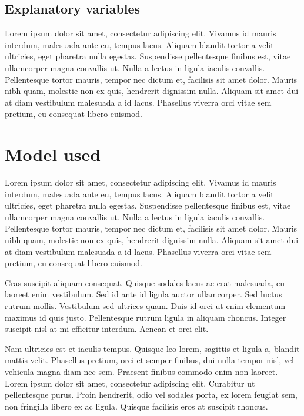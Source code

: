\documentclass[a4paper, nobind]{templates/ociamthesis}
\theoremstyle{definition}
\theoremstyle{definition}
\theoremstyle{definition}
\theoremstyle{remark}
\begin{document}
\hypertarget{explanatory-variables}{%
\subsection{Explanatory variables}\label{explanatory-variables}}

Lorem ipsum dolor sit amet, consectetur adipiscing elit. Vivamus id mauris interdum, malesuada ante eu, tempus lacus. Aliquam blandit tortor a velit ultricies, eget pharetra nulla egestas. Suspendisse pellentesque finibus est, vitae ullamcorper magna convallis ut. Nulla a lectus in ligula iaculis convallis. Pellentesque tortor mauris, tempor nec dictum et, facilisis sit amet dolor. Mauris nibh quam, molestie non ex quis, hendrerit dignissim nulla. Aliquam sit amet dui at diam vestibulum malesuada a id lacus. Phasellus viverra orci vitae sem pretium, eu consequat libero euismod.

\newpage

\hypertarget{model-used}{%
\section{Model used}\label{model-used}}

Lorem ipsum dolor sit amet, consectetur adipiscing elit. Vivamus id mauris interdum, malesuada ante eu, tempus lacus. Aliquam blandit tortor a velit ultricies, eget pharetra nulla egestas. Suspendisse pellentesque finibus est, vitae ullamcorper magna convallis ut. Nulla a lectus in ligula iaculis convallis. Pellentesque tortor mauris, tempor nec dictum et, facilisis sit amet dolor. Mauris nibh quam, molestie non ex quis, hendrerit dignissim nulla. Aliquam sit amet dui at diam vestibulum malesuada a id lacus. Phasellus viverra orci vitae sem pretium, eu consequat libero euismod.

Cras suscipit aliquam consequat. Quisque sodales lacus ac erat malesuada, eu laoreet enim vestibulum. Sed id ante id ligula auctor ullamcorper. Sed luctus rutrum mollis. Vestibulum sed ultrices quam. Duis id orci ut enim elementum maximus id quis justo. Pellentesque rutrum ligula in aliquam rhoncus. Integer suscipit nisl at mi efficitur interdum. Aenean et orci elit.

Nam ultricies est et iaculis tempus. Quisque leo lorem, sagittis et ligula a, blandit mattis velit. Phasellus pretium, orci et semper finibus, dui nulla tempor nisl, vel vehicula magna diam nec sem. Praesent finibus commodo enim non laoreet. Lorem ipsum dolor sit amet, consectetur adipiscing elit. Curabitur ut pellentesque purus. Proin hendrerit, odio vel sodales porta, ex lorem feugiat sem, non fringilla libero ex ac ligula. Quisque facilisis eros at suscipit rhoncus.
\end{document}
